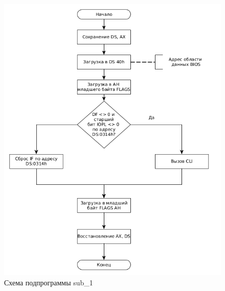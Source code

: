 \begin{figure}[h!]
	\begin{center}
		\includegraphics[scale=0.8]{img/subroutine}
	\end{center}
	\captionsetup{justification=centering}
	\caption{Схема подпрограммы sub\_1}
	\label{img:s1}
\end{figure}
\FloatBarrier